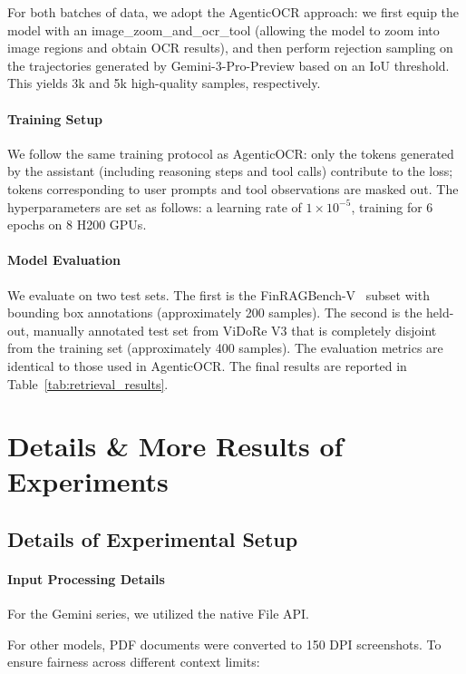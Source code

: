 \documentclass{llmxive}
\begin{document}
{{{For both batches of data, we adopt the AgenticOCR approach: we first equip the model with an image\_zoom\_and\_ocr\_tool (allowing the model to zoom into image regions and obtain OCR results), and then perform rejection sampling on the trajectories generated by Gemini-3-Pro-Preview based on an IoU threshold. This yields 3k and 5k high-quality samples, respectively.

\paragraph{Training Setup} We follow the same training protocol as AgenticOCR: only the tokens generated by the assistant (including reasoning steps and tool calls) contribute to the loss; tokens corresponding to user prompts and tool observations are masked out. The hyperparameters are set as follows: a learning rate of \(1 \times 10^{-5}\), training for 6 epochs on 8 H200 GPUs.

\paragraph{Model Evaluation} We evaluate on two test sets. The first is the FinRAGBench-V~\citep{zhao-etal-2025-finragbench} subset with bounding box annotations (approximately 200 samples). The second is the held-out, manually annotated test set from ViDoRe V3 that is completely disjoint from the training set (approximately 400 samples). The evaluation metrics are identical to those used in AgenticOCR. The final results are reported in Table~\ref{tab:retrieval_results}.



\section{Details \& More Results of Experiments}
\label{Details & More Results of Experiments}
\subsection{Details of Experimental Setup}
\label{Appendix: Details of Experiments}
\paragraph{Input Processing Details} For the Gemini series, we utilized the native File API.

For other models, PDF documents were converted to 150 DPI screenshots. To ensure fairness across different context limits:

}}}
\end{document}
